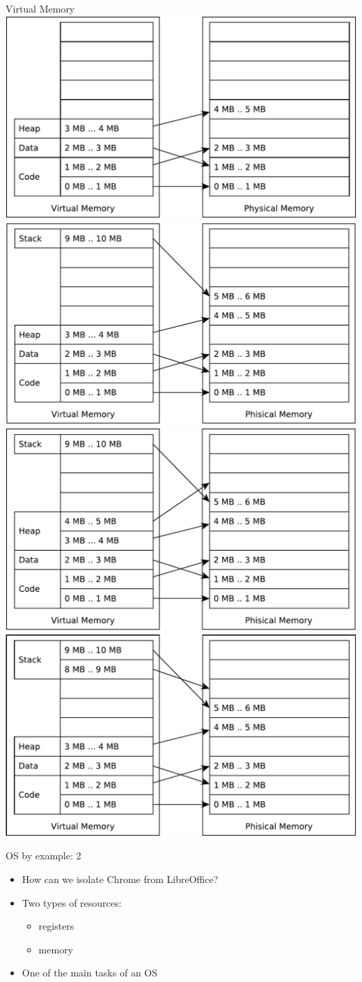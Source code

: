 \documentclass{beamer}
\begin{document}
\begin{frame}{Virtual Memory}
{}
     {
  \includegraphics[width=0.5\linewidth]{mmu7}
}
     {
  \includegraphics[width=0.5\linewidth]{mmu8}
}
     {
  \includegraphics[width=0.5\linewidth]{mmu9}
}
     {
  \includegraphics[width=0.5\linewidth]{mmu10}
}
\end{frame}





\begin{frame}{OS by example: 2}
  \begin{itemize}
    \item How can we isolate Chrome from LibreOffice?
    \item<2-> Two types of resources:
      \begin{itemize}
        \item registers 
        \item memory 
      \end{itemize}
    \item <3-> One of the main tasks of an OS
  \end{itemize}
\end{frame}
\end{document}
